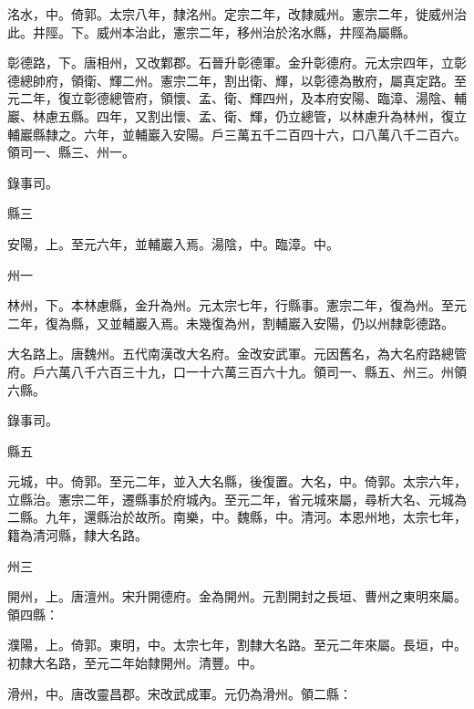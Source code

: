 \begin{pinyinscope}
 洺水，中。倚郭。太宗八年，隸洺州。定宗二年，改隸威州。憲宗二年，徙威州治此。井陘。下。威州本治此，憲宗二年，移州治於洺水縣，井陘為屬縣。



 彰德路，下。唐相州，又改鄴郡。石晉升彰德軍。金升彰德府。元太宗四年，立彰德總帥府，領衛、輝二州。憲宗二年，割出衛、輝，以彰德為散府，屬真定路。至元二年，復立彰德總管府，領懷、孟、衛、輝四州，及本府安陽、臨漳、湯陰、輔巖、林慮五縣。四年，又割出懷、孟、衛、輝，仍立總管，以林慮升為林州，復立輔巖縣隸之。六年，並輔巖入安陽。戶三萬五千二百四十六，口八萬八千二百六。領司一、縣三、州一。



 錄事司。



 縣三



 安陽，上。至元六年，並輔巖入焉。湯陰，中。臨漳。中。



 州一



 林州，下。本林慮縣，金升為州。元太宗七年，行縣事。憲宗二年，復為州。至元二年，復為縣，又並輔巖入焉。未幾復為州，割輔巖入安陽，仍以州隸彰德路。



 大名路上。唐魏州。五代南漢改大名府。金改安武軍。元因舊名，為大名府路總管府。戶六萬八千六百三十九，口一十六萬三百六十九。領司一、縣五、州三。州領六縣。



 錄事司。



 縣五



 元城，中。倚郭。至元二年，並入大名縣，後復置。大名，中。倚郭。太宗六年，立縣治。憲宗二年，遷縣事於府城內。至元二年，省元城來屬，尋析大名、元城為二縣。九年，還縣治於故所。南樂，中。魏縣，中。清河。本恩州地，太宗七年，籍為清河縣，隸大名路。



 州三



 開州，上。唐澶州。宋升開德府。金為開州。元割開封之長垣、曹州之東明來屬。領四縣：



 濮陽，上。倚郭。東明，中。太宗七年，割隸大名路。至元二年來屬。長垣，中。初隸大名路，至元二年始隸開州。清豐。中。



 滑州，中。唐改靈昌郡。宋改武成軍。元仍為滑州。領二縣：




\end{pinyinscope}
